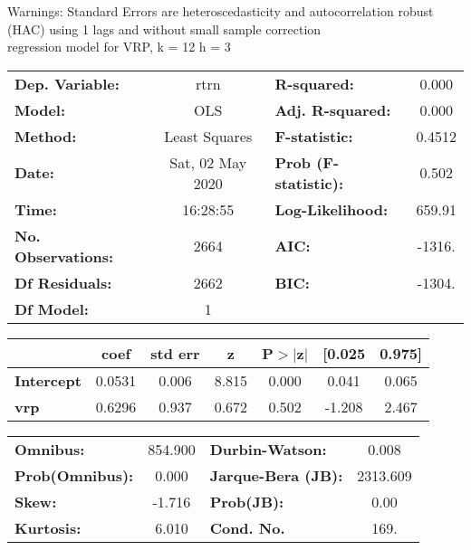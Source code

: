 Warnings: \newline
 [1] Standard Errors are heteroscedasticity and autocorrelation robust (HAC) using 1 lags and without small sample correction\\ 

regression model for VRP, k = 12 h = 3\begin{center}
\begin{tabular}{lclc}
\toprule
\textbf{Dep. Variable:}    &       rtrn       & \textbf{  R-squared:         } &     0.000   \\
\textbf{Model:}            &       OLS        & \textbf{  Adj. R-squared:    } &     0.000   \\
\textbf{Method:}           &  Least Squares   & \textbf{  F-statistic:       } &    0.4512   \\
\textbf{Date:}             & Sat, 02 May 2020 & \textbf{  Prob (F-statistic):} &    0.502    \\
\textbf{Time:}             &     16:28:55     & \textbf{  Log-Likelihood:    } &    659.91   \\
\textbf{No. Observations:} &        2664      & \textbf{  AIC:               } &    -1316.   \\
\textbf{Df Residuals:}     &        2662      & \textbf{  BIC:               } &    -1304.   \\
\textbf{Df Model:}         &           1      & \textbf{                     } &             \\
\bottomrule
\end{tabular}
\begin{tabular}{lcccccc}
                   & \textbf{coef} & \textbf{std err} & \textbf{z} & \textbf{P$> |$z$|$} & \textbf{[0.025} & \textbf{0.975]}  \\
\midrule
\textbf{Intercept} &       0.0531  &        0.006     &     8.815  &         0.000        &        0.041    &        0.065     \\
\textbf{vrp}       &       0.6296  &        0.937     &     0.672  &         0.502        &       -1.208    &        2.467     \\
\bottomrule
\end{tabular}
\begin{tabular}{lclc}
\textbf{Omnibus:}       & 854.900 & \textbf{  Durbin-Watson:     } &    0.008  \\
\textbf{Prob(Omnibus):} &   0.000 & \textbf{  Jarque-Bera (JB):  } & 2313.609  \\
\textbf{Skew:}          &  -1.716 & \textbf{  Prob(JB):          } &     0.00  \\
\textbf{Kurtosis:}      &   6.010 & \textbf{  Cond. No.          } &     169.  \\
\bottomrule
\end{tabular}
\end{center}

